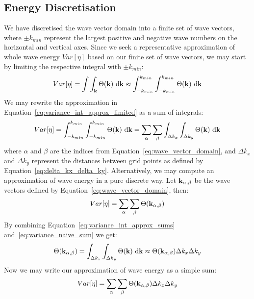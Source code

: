 \subsection{Energy Discretisation}
We have discretised the wave vector domain into a finite set of wave vectors, 
where $\pm k_{min}$ represent the largest positive and negative wave numbers on 
the horizontal and vertical axes. Since we seek a representative approximation 
of whole wave energy $Var[\eta]$ based on our finite set of wave vectors, we may 
start by limiting the respective integral with $\pm k_{min}$:
\begin{equation}
\label{eq:variance_int_approx_limited}
Var[\eta] = \int\int_{\mathbf{k}}\Theta(\mathbf{k})~\mathrm{d}\mathbf{k}
\approx\int_{-k_{min}}^{k_{min}}\int_{-k_{min}}^{k_{min}}\Theta(\mathbf{k}
)~\mathrm{d}\mathbf{k}
\end{equation}
We may rewrite the approximation in 
Equation~\ref{eq:variance_int_approx_limited} as a sum of integrals:
%
\begin{equation}
\label{eq:variance_int_approx_sums}
 Var[\eta] = \int_{-k_{min}}^{k_{min}}\int_{-k_{min}}^{k_{min}}\Theta(\mathbf{k}
)~\mathrm{d}\mathbf{k} = \sum_{\alpha}\sum_{\beta}\int_{\Delta k_x}\int_{\Delta 
k_y}\Theta(\mathbf{k})~\mathrm{d}\mathbf{k}
\end{equation}
%
where $\alpha$ and $\beta$ are the indices from 
Equation~\ref{eq:wave_vector_domain}, and $\Delta k_x$ and $\Delta k_y$ 
represent the distances between grid points as defined by 
Equation~\ref{eq:delta_kx_delta_ky}. Alternatively, we may compute an 
approximation of wave energy in a pure discrete way. Let 
$\mathbf{k}_{\alpha,\beta}$ be the wave vectors defined by 
Equation~\ref{eq:wave_vector_domain}, then:
%
\begin{equation}
\label{eq:variance_naive_sum}
 Var[\eta] = \sum_{\alpha}\sum_{\beta}\Theta(\mathbf{k}_{\alpha,\beta})
\end{equation}
%
By combining Equation~\ref{eq:variance_int_approx_sums} 
and~\ref{eq:variance_naive_sum} we get:
%
\begin{equation}
 \Theta(\mathbf{k}_{\alpha,\beta}) = \int_{\Delta k_x}\int_{\Delta 
k_y}\Theta(\mathbf{k})~\mathrm{d}\mathbf{k} \approx 
\Theta(\mathbf{k}_{\alpha,\beta})\Delta k_x\Delta k_y
\end{equation}
Now we may write our approximation of wave energy as a simple sum:
\begin{equation}
 Var[\eta] = \sum_{\alpha}\sum_{\beta}\Theta(\mathbf{k}_{\alpha,\beta})\Delta k_x 
\Delta k_y
\end{equation}


